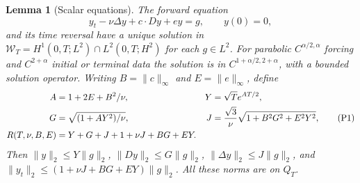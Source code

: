 \documentclass[11pt,a4paper]{article}
\newtheorem{lemma}[theorem]{Lemma}
\begin{document}
\begin{lemma}[Scalar equations]\label{scalar}
The forward equation
\[
 y_t-\nu\Delta y+c\cdot Dy+e y=g,\qquad y(0)=0,
\]
and its time reversal have a unique solution in
$\mathcal W_T=H^1(0,T;L^2)\cap L^2(0,T;H^2)$ for each $g\in L^2$.
For parabolic $C^{\alpha/2,\alpha}$ forcing and $C^{2+\alpha}$
initial or terminal data the solution is in
$C^{1+\alpha/2,2+\alpha}$, with a bounded solution operator.
Writing $B=\|c\|_\infty$ and $E=\|e\|_\infty$, define
\begin{align}
 A&=1+2E+B^2/\nu,&Y&=\sqrt T e^{AT/2},\notag\\
 G&=\sqrt{(1+AY^2)/\nu},&
 J&=\frac{\sqrt3}{\nu}\sqrt{1+B^2G^2+E^2Y^2},\tag{P1}\label{P1}\\
 R(T,\nu,B,E)&=Y+G+J+1+\nu J+BG+EY.\notag
\end{align}
Then $\|y\|_2\leq Y\|g\|_2$, $\|Dy\|_2\leq G\|g\|_2$,
$\|\Delta y\|_2\leq J\|g\|_2$, and
$\|y_t\|_2\leq(1+\nu J+BG+EY)\|g\|_2$.
All these norms are on $Q_T$.
\end{lemma}
\end{document}
